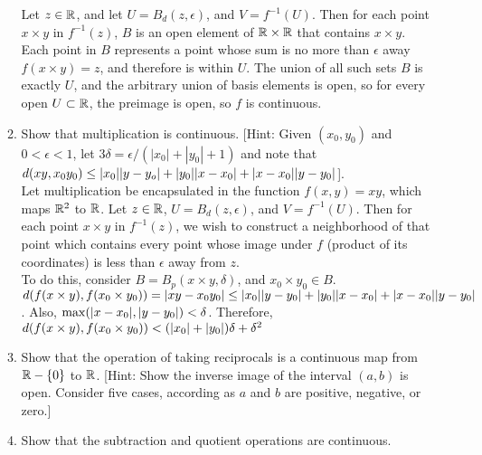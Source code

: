 \documentclass[12pt,letterpaper]{article}
\begin{document}
\begin{enumerate}
\begin{enumerate}
    Let $z\in \mathbb{R}$, and let $U=B_d(z,\epsilon)$, and $V=f^{-1}(U)$.  Then for each point $x\times y$ in $f^{-1}(z)$, $B$ is an open element of $\mathbb{R}\times\mathbb{R}$ that contains $x\times y$. Each point in $B$ represents a point whose sum is no more than $\epsilon$ away $f(x\times y)=z$, and therefore is within $U$. The union of all such sets $B$ is exactly $U$, and the arbitrary union of basis elements is open, so for every open $U\subset \mathbb{R}$, the preimage is open, so $f$ is continuous.
    \item Show that multiplication is continuous. [Hint: Given $(x_0,y_0)$ and $0<\epsilon<1$, let $3\delta = \epsilon/(|x_0|+|y_0|+1)$ and note that $d(xy,x_0y_0)\leq \lvert x_0\rvert\lvert y-y_o\rvert + \lvert y_0\rvert\lvert x-x_0\rvert + \lvert x-x_0\rvert\lvert y-y_0\rvert$]. \\
    Let multiplication be encapsulated in the function $f(x,y) = xy$, which maps $\mathbb{R}^2$ to $\mathbb{R}$. Let $z\in \mathbb{R}$, $U=B_d(z,\epsilon)$, and $V=f^{-1}(U)$. Then for each point $x\times y$ in $f^{-1}(z)$, we wish to construct a neighborhood of that point which contains every point whose image under $f$ (product of its coordinates) is less than $\epsilon$ away from $z$. \\
    To do this, consider $B=B_p(x\times y, \delta)$, and $x_0\times y_0\in B$. $d(f(x\times y), f(x_0\times y_0)) = \lvert xy-x_0y_0\rvert  \leq \lvert x_0\rvert\lvert y-y_0\rvert + \lvert y_0\rvert\lvert x-x_0\rvert + \lvert x-x_0\rvert\lvert y-y_0\rvert$. Also, $\max(\lvert x-x_0\rvert,\lvert y-y_0\rvert)<\delta$. Therefore, $d(f(x\times y),f(x_0\times y_0)) < (\lvert x_0\rvert+\lvert y_0\rvert)\delta+\delta^2$
    \item Show that the operation of taking reciprocals is a continuous map from $\mathbb{R}-\{0\}$ to $\mathbb{R}$. [Hint: Show the inverse image of the interval $(a,b)$ is open. Consider five cases, according as $a$ and $b$ are positive, negative, or zero.]
    \item Show that the subtraction and quotient operations are continuous.
  \end{enumerate}
\end{enumerate}
\end{document}
